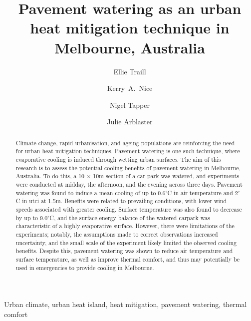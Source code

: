 \documentclass[final,3p,times,authoryear]{elsarticle}
\begin{document}
\title{Pavement watering as an urban heat mitigation technique in Melbourne, Australia}

\author[monash]{Ellie Traill}
\author[melb]{Kerry~A.~Nice}

\author[monash]{Nigel Tapper}
\author[monash]{Julie Arblaster}

\address[melb]{Transport, Health, and Urban Design Research Lab, Faculty of Architecture, Building, and Planning, University of Melbourne, VIC, Australia.}
\address[monash]{School of Earth, Atmosphere and Environment, Monash University, Clayton, VIC 3800, Australia.}




\begin{abstract}

Climate change, rapid urbanisation, and ageing populations are reinforcing the need for urban heat mitigation techniques. Pavement watering is one such technique, where evaporative cooling is induced through wetting urban surfaces. The aim of this research is to assess the potential cooling benefits of pavement watering in Melbourne, Australia. To do this, a 10 $\times$ 10m section of a car park was watered, and experiments were conducted at midday, the afternoon, and the evening across three days. Pavement watering was found to induce a mean cooling of up to 0.6$^{\circ}$C in air temperature and 2$^{\circ}$C in \gls{utci} at 1.5m. Benefits were related to prevailing conditions, with lower wind speeds associated with greater cooling. Surface temperature was also found to decrease by up to 9.0$^{\circ}$C, and the surface energy balance of the watered carpark was characteristic of a highly evaporative surface. However, there were limitations of the experiments; notably, the assumptions made to correct observations increased uncertainty, and the small scale of the experiment likely limited the observed cooling benefits. Despite this, pavement watering was shown to reduce air temperature and surface temperature, as well as improve thermal comfort, and thus may potentially be used in emergencies to provide cooling in Melbourne.

\end{abstract}

\begin{keyword}
Urban climate\sep
urban heat island\sep 
heat mitigation\sep 
pavement watering\sep 
thermal comfort
\end{keyword}
\end{document}

